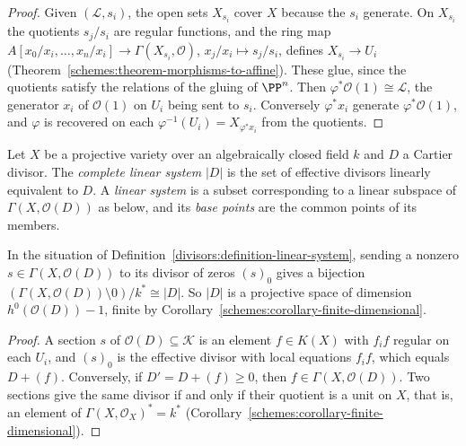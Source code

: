 \begin{proof}
Given $(\mathcal{L}, s_i)$, the open sets $X_{s_i}$ cover $X$ because the $s_i$ generate. On $X_{s_i}$ the quotients $s_j/s_i$ are regular functions, and the
ring map $A[x_0/x_i, \ldots, x_n/x_i] \to \Gamma(X_{s_i}, \mathcal{O})$, $x_j/x_i \mapsto s_j/s_i$, defines $X_{s_i} \to U_i$
(Theorem~\ref{schemes:theorem-morphisms-to-affine}). These glue, since the quotients satisfy the relations of the gluing of $\PP^n$. Then
$\varphi^*\mathcal{O}(1) \cong \mathcal{L}$, the generator $x_i$ of $\mathcal{O}(1)$ on $U_i$ being sent to $s_i$. Conversely $\varphi^*x_i$ generate $\varphi^*\mathcal{O}(1)$, and
$\varphi$ is recovered on each $\varphi^{-1}(U_i) = X_{\varphi^*x_i}$ from the quotients.
\end{proof}

\begin{definition}\label{divisors:definition-linear-system}
Let $X$ be a projective variety over an algebraically closed field $k$ and $D$ a Cartier divisor. The \emph{complete linear system} $|D|$ is the set of effective divisors
linearly equivalent to $D$. A \emph{linear system} is a subset corresponding to a linear subspace of $\Gamma(X, \mathcal{O}(D))$ as below, and its \emph{base points}
are the common points of its members.
\end{definition}

\begin{proposition}\label{divisors:proposition-linear-system}
In the situation of Definition~\ref{divisors:definition-linear-system}, sending a nonzero $s \in \Gamma(X, \mathcal{O}(D))$ to its divisor of zeros $(s)_0$ gives a bijection
$(\Gamma(X, \mathcal{O}(D)) \setminus 0)/k^* \cong |D|$. So $|D|$ is a projective space of dimension $h^0(\mathcal{O}(D)) - 1$, finite by
Corollary~\ref{schemes:corollary-finite-dimensional}.
\end{proposition}

\begin{proof}
A section $s$ of $\mathcal{O}(D) \subseteq \mathcal{K}$ is an element $f \in K(X)$ with $f_if$ regular on each $U_i$, and $(s)_0$ is the effective divisor with local equations
$f_if$, which equals $D + (f)$. Conversely, if $D' = D + (f) \geq 0$, then $f \in \Gamma(X, \mathcal{O}(D))$. Two sections give the same divisor if and only if their quotient
is a unit on $X$, that is, an element of $\Gamma(X, \mathcal{O}_X)^* = k^*$ (Corollary~\ref{schemes:corollary-finite-dimensional}).
\end{proof}

